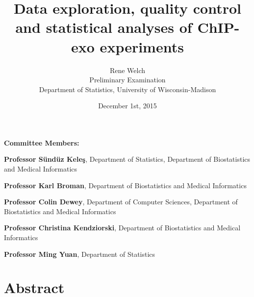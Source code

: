 \documentclass[11pt]{article}\usepackage[]{graphicx}\usepackage[]{color}
\title{Data exploration, quality control and statistical analyses of
  ChIP-exo experiments\vspace*{\fill}}
\author{Rene Welch\\Preliminary Examination\\Department of Statistics,
  University of Wisconsin-Madison}
\date{December 1st, 2015}
\begin{document}
\newcommand{\sig}{\sigma^{70}}


\maketitle

\vspace*{\fill}

\textbf{Committee Members:}

\textbf{Professor S\"und\"uz Kele\c{s}}, Department of Statistics,
Department of Biostatistics and Medical Informatics

\textbf{Professor Karl Broman}, Department of Biostatistics and
Medical Informatics

\textbf{Professor Colin Dewey}, Department of Computer Sciences,
Department of Biostatistics and Medical Informatics

\textbf{Professor Christina Kendziorski}, Department of Biostatistics
and Medical Informatics

\textbf{Professor Ming Yuan}, Department of Statistics

\thispagestyle{empty}


\newpage

\tableofcontents

\newpage

\listoffigures

\newpage


\section*{Abstract}








\end{document}
